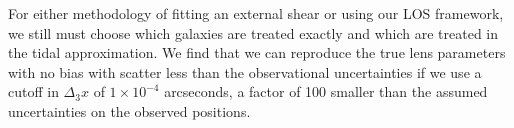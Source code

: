 For either methodology of fitting an external shear or using our LOS framework, we still must choose which galaxies are treated exactly and which are treated in the tidal approximation. We find that we can reproduce the true lens parameters with no bias with scatter less than the observational uncertainties if we use a cutoff in $\Delta_3x$ of $1\times 10^{-4}$ arcseconds, a factor of 100 smaller than the assumed uncertainties on the observed positions.
 